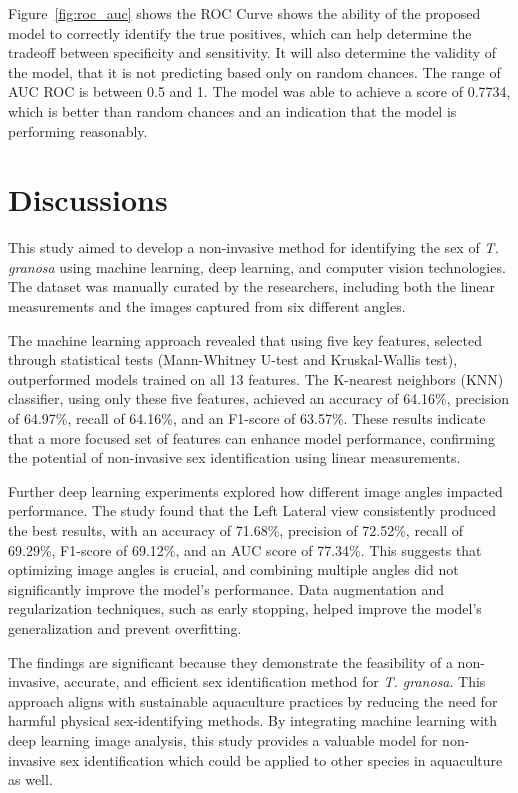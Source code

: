Figure~\ref{fig:roc_auc} shows the ROC Curve shows the ability of the proposed model to correctly identify the true positives, which can help determine the tradeoff between specificity and sensitivity. It will also determine the validity of the model, that it is not predicting based only on random chances. The range of AUC ROC is between 0.5 and 1. The model was able to achieve a score of 0.7734, which is better than random chances and an indication that the model is performing reasonably. 

\section{Discussions}

This study aimed to develop a non-invasive method for identifying the sex of \textit{T. granosa} using machine learning, deep learning, and computer vision technologies. The dataset was manually curated by the researchers, including both the linear measurements and the images captured from six different angles.

The machine learning approach revealed that using five key features, selected through statistical tests (Mann-Whitney U-test and Kruskal-Wallis test), outperformed models trained on all 13 features. The K-nearest neighbors (KNN) classifier, using only these five features, achieved an accuracy of 64.16\%, precision of 64.97\%, recall of 64.16\%, and an F1-score of 63.57\%. These results indicate that a more focused set of features can enhance model performance, confirming the potential of non-invasive sex identification using linear measurements.

Further deep learning experiments explored how different image angles impacted performance. The study found that the Left Lateral view consistently produced the best results, with an accuracy of 71.68\%, precision of 72.52\%, recall of 69.29\%, F1-score of 69.12\%, and an AUC score of 77.34\%. This suggests that optimizing image angles is crucial, and combining multiple angles did not significantly improve the model’s performance. Data augmentation and regularization techniques, such as early stopping, helped improve the model's generalization and prevent overfitting.

The findings are significant because they demonstrate the feasibility of a non-invasive, accurate, and efficient sex identification method for \textit{T. granosa}. This approach aligns with sustainable aquaculture practices by reducing the need for harmful physical sex-identifying methods. By integrating machine learning with deep learning image analysis, this study provides a valuable model for non-invasive sex identification which could be applied to other species in aquaculture as well.

